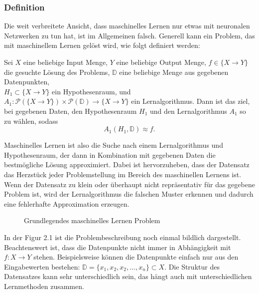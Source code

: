 \documentclass[12pt,letterpaper,ngerman]{article}
\begin{document}
\subsubsection{Definition}
Die weit verbreitete Ansicht, dass maschinelles Lernen nur etwas mit neuronalen 
Netzwerken zu tun hat, ist im Allgemeinen falsch. Generell kann ein Problem, 
das mit maschinellem Lernen gelöst wird, wie folgt definiert werden:
\begin{definition}
  Sei $X$ eine beliebige Input Menge, $Y$ eine beliebige Output Menge,
  $f \in \{X \to Y\}$ die gesuchte Lösung des Problems, 
  $\mathbb{D}$ eine beliebige Menge aus gegebenen Datenpunkten,\\
  $H_1 \subset \{X \to Y\}$ ein Hypothesenraum, und 
  $A_1: \mathcal{P}(\{X \to Y\}) \times 
  \mathcal{P}(\mathbb{D}) \to \{ X \to Y \} $
  ein Lernalgorithmus. Dann ist das ziel, bei gegebenen Daten,
  den Hypothesenraum $H_1$ und den Lernalgorithmus $A_1$ so zu wählen,
  sodass
  \[
    A_1(H_1, \mathbb{D}) \approx f.
  \]
\end{definition}
Maschinelles Lernen ist also die Suche nach einem Lernalgorithmus und 
Hypothesenraum, der dann in Kombination mit gegebenen Daten die bestmögliche
Lösung approximiert. Dabei ist hervorzuheben, dass der Datensatz das Herzstück
jeder Problemstellung im Bereich des maschinellen Lernens ist. Wenn der
Datensatz zu klein oder überhaupt nicht repräsentativ für das gegebene Problem 
ist, wird der Lernalgorithmus die falschen Muster erkennen und dadurch eine 
fehlerhafte Approximation erzeugen.
\begin{figure}[H]
  \begin{center}
    \caption{Grundlegendes maschinelles Lernen Problem}
  \end{center}
\end{figure}
\hfill
\pagebreak
In der Figur 2.1 ist die Problembeschreibung noch einmal bildlich dargestellt.
Beachtenswert ist, dass die Datenpunkte nicht immer in Abhängigkeit mit 
$f: X \to Y$ stehen. Beispielsweise können die Datenpunkte einfach nur aus den
Eingabewerten bestehen: $\mathbb{D} = \{x_1,x_2,x_2, \dots, x_n\} \subset X$.
Die Struktur des Datensatzes kann sehr unterschiedlich sein, das hängt auch mit 
unterschiedlichen Lernmethoden zusammen.
\end{document}

